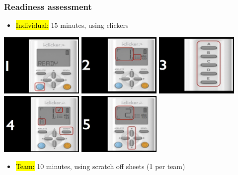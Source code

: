 \documentclass[11pt,containsverbatim,handout,xcolor=xelatex,dvipsnames,table]{beamer}
\begin{document}
\begin{frame}
\frametitle{Readiness assessment}

\begin{itemize}

\item \hl{Individual:} 15 minutes, using clickers

\end{itemize}

\begin{center}
\includegraphics[width=0.3\textwidth]{figures/clicker_self_paced/self_paced_1}
\hspace{1mm}
\includegraphics[width=0.3\textwidth]{figures/clicker_self_paced/self_paced_2}
\hspace{1mm}
\includegraphics[width=0.3\textwidth]{figures/clicker_self_paced/self_paced_3} \\
\includegraphics[width=0.3\textwidth]{figures/clicker_self_paced/self_paced_4}
\hspace{1mm}
\includegraphics[width=0.3\textwidth]{figures/clicker_self_paced/self_paced_5}
\end{center}

\begin{itemize}

\item \hl{Team:} 10 minutes, using scratch off sheets (1 per team)

\end{itemize}

\end{frame}
\end{document}
